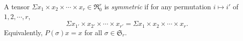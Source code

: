 A tensor $\Sigma x_1 \times x_2 \times \cdots \times x_r \in \Re_0^r$ is \textit{symmetric} if for any permutation $i \mapsto i'$ of $1, 2, \cdots, r$,
$$\Sigma x_{1'} \times x_{2'} \times \cdots \times x_{r'} = \Sigma x_1 \times x_2 \times \cdots \times x_r.$$
Equivalently, $P(\sigma)x = x$ for all $\sigma \in \mathfrak{S}_r$.
